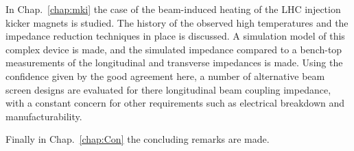 In Chap.~\ref{chap:mki} the case of the beam-induced heating of the LHC injection kicker magnets is studied. The history of the observed high temperatures and the impedance reduction techniques in place is discussed. A simulation model of this complex device is made, and the simulated impedance compared to a bench-top measurements of the longitudinal and transverse impedances is made. Using the confidence given by the good agreement here, a number of alternative beam screen designs are evaluated for there longitudinal beam coupling impedance, with a constant concern for other requirements such as electrical breakdown and manufacturability.

Finally in Chap.~\ref{chap:Con} the concluding remarks are made.